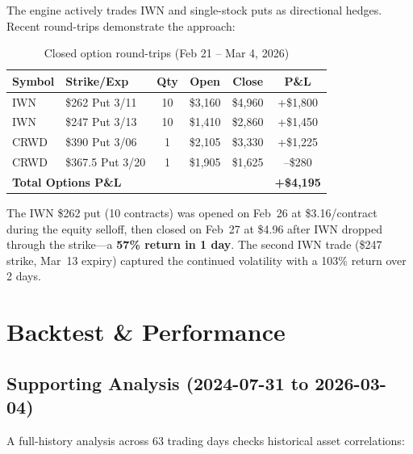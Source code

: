 \documentclass[11pt,letterpaper]{article}
\begin{document}
The engine actively trades IWN and single-stock puts as directional hedges.
Recent round-trips demonstrate the approach:

\begin{table}[H]
\centering
\caption{Closed option round-trips (Feb 21 -- Mar 4, 2026)}
\begin{tabular}{llcccc}
\toprule
Symbol & Strike/Exp & Qty & Open & Close & P\&L \\
\midrule
IWN & \$262 Put 3/11 & 10 & \$3,160 & \$4,960 & \textcolor{gain}{+\$1,800} \\
IWN & \$247 Put 3/13 & 10 & \$1,410 & \$2,860 & \textcolor{gain}{+\$1,450} \\
CRWD & \$390 Put 3/06 & 1  & \$2,105 & \$3,330 & \textcolor{gain}{+\$1,225} \\
CRWD & \$367.5 Put 3/20 & 1 & \$1,905 & \$1,625 & \textcolor{loss}{--\$280} \\
\midrule
\multicolumn{4}{l}{\textbf{Total Options P\&L}} & & \textcolor{gain}{\textbf{+\$4,195}} \\
\bottomrule
\end{tabular}
\end{table}

The IWN \$262 put (10 contracts) was opened on Feb~26 at \$3.16/contract
during the equity selloff, then closed on Feb~27 at \$4.96 after IWN
dropped through the strike---a \textbf{57\% return in 1 day}. The second
IWN trade (\$247 strike, Mar~13 expiry) captured the continued
volatility with a 103\% return over 2 days.



\section{Backtest \& Performance}

\subsection{Supporting Analysis (2024-07-31 to 2026-03-04)}

A full-history analysis across 63 trading days checks historical asset
correlations:
\end{document}
